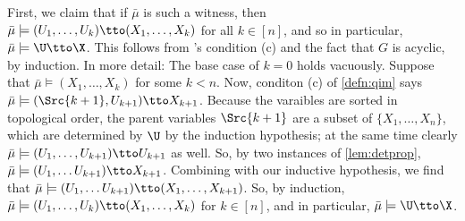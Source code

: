 \begin{subappendices}
\begin{lproof}
    First, we claim that if $\bar\mu$ is such a witness, then 
    $\bar\mu \models (U_1, \ldots, U_k) \tto (X_1, \ldots, X_k)$
    for all $k \in [n]$, and so in particular, $\bar\mu \models \U \tto \X$. 
    This follows from \scibility's condition (c) and the fact that $G$ is acyclic, by induction.
    In more detail:
    The base case of $k=0$ holds vacuously.
    Suppose that $\bar\mu \models (X_1, \ldots, X_k)$ for some $k < n$. 
    Now, conditon (c) of \cref{defn:qim} says 
    $\bar\mu  \models (\Src {k+1}, U_{k+1}) \tto X_{k+1}$. 
    Because the varaibles are sorted in topological order, the parent variables $\Src {k+1}$ are a subset of $\{X_1, \ldots, X_n\}$, which are determined by $\U$ by the induction hypothesis;
    at the same time clearly $\bar\mu \models (U_1, \ldots, U_{k+1}) \tto U_{k+1}$  as well. 
    So, by two instances of \cref{lem:detprop}, 
        $\bar\mu \models (U_1, \ldots U_{k+1}) \tto X_{k+1}$.
    Combining with our inductive hypothesis, we find that
        $\bar\mu \models (U_1, \ldots U_{k+1}) \tto (X_1, \ldots, X_{k+1})$.
    So, by induction, 
    $\bar\mu \models (U_1, \ldots, U_k) \tto (X_1, \ldots, X_k)$
    for $k \in [n]$, and in particular, $\bar\mu \models \U \tto \X$.
    


\end{lproof}
\end{subappendices}
